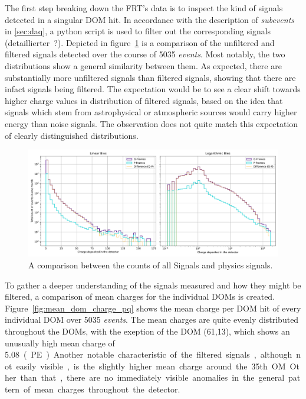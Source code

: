 The first step breaking down the FRT's data is to inspect the kind of signals detected in a singular DOM hit. In accordance with the description of 
\textit{subevents} in \ref{sec:daq}, a python script is used to filter out the corresponding signals (detaillierter~?). Depicted in 
figure~\ref{fig:frt_mu_sub_comp_1} is a comparison of the unfiltered and filtered signals detected over the course of \num{5035} \textit{events}. Most notably, 
the two distributions show a 
general similarity between them. As expected, there are substantially more unfiltered signals than filtered signals, showing that there are infact signals 
being filtered. The expectation would be to see a clear shift towards higher 
charge values in distribution of filtered signals, based on the idea that signals which stem from astrophysical or atmospheric sources would carry higher energy 
than noise signals. The observation does not quite match this expectation of clearly distinguished distributions. 

\begin{figure}[H]
    \centering
    \includegraphics[width=\textwidth]{Plots/q_p_comp.pdf}
    \caption{A comparison between the counts of all Signals and physics signals.}
    \label{fig:frt_mu_sub_comp_1}
\end{figure}

To gather a deeper understanding of the signals measured and how they might be filtered, a comparison of mean charges for the individual DOMs is created. 
Figure~\ref{fig:mean_dom_charge_pq} shows the mean charge per DOM hit of every individual DOM over \num{5035} \textit{events}. 
The mean charges are quite evenly distributed throughout the DOMs, with the exeption of the DOM (61,13), which shows an unusually high mean charge of 
\num{5.08}~\unit(PE). Another notable characteristic of the filtered signals, although not easily visible, is the slightly higher mean charge around the 35th OM. 
Other than that, there are no immediately visible anomalies in the general pattern of mean charges throughout the detector. 


